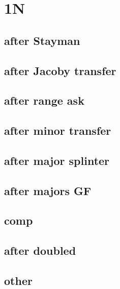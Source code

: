\section{1N}


\subsection{after Stayman}


\subsection{after Jacoby transfer}


\subsection{after range ask}


\subsection{after minor transfer}


\subsection{after major splinter}


\subsection{after majors GF}


\subsection{comp}







\subsection{after doubled}


\subsection{other}


